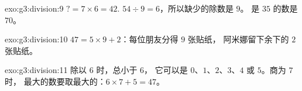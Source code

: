 \begin{solution}{exo:g3:division:9}
$? = 7 \times 6 = 42$. \quad
$54 \div 9 = 6$，所以缺少的除数是 $9$。\quad
{}是 $35$ 的数是 $70$。
\end{solution}

\begin{solution}{exo:g3:division:10}
$47 = 5 \times 9 + 2$：每位朋友分得 $9$ 张贴纸，
阿米娜留下余下的 $2$ 张贴纸。
\end{solution}

\begin{solution}{exo:g3:division:11}
除以 $6$ 时，总小于 $6$，
它可以是 $0$、$1$、$2$、$3$、$4$ 或 $5$。商为 $7$ 时，
最大的数要取最大的：$6 \times 7 + 5 = 47$。
\end{solution}
